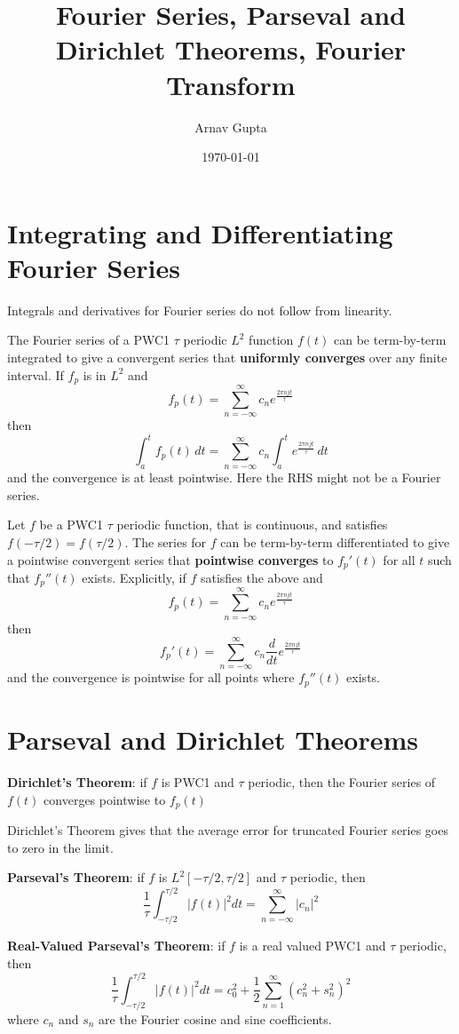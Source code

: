 \documentclass[11pt]{article}
\author{Arnav Gupta}
\date{\today}
\title{Fourier Series, Parseval and Dirichlet Theorems, Fourier Transform}
\begin{document}
\maketitle
\tableofcontents

\section{Integrating and Differentiating Fourier Series}
\label{sec:org465c8c5}
Integrals and derivatives for Fourier series do not follow from linearity.

The Fourier series of a PWC1 \(\tau\) periodic \(L^{2}\) function \(f(t)\) can be term-by-term integrated to give a convergent
series that \textbf{uniformly converges} over any finite interval.
If \(f_{p}\) is in \(L^{2}\) and
$$
f_{p}(t) = \sum_{n = -\infty}^{\infty} c_{n} e^{\frac{2\pi n j t}{\tau}}
$$
then
$$
\int_{a}^{t} f_{p}(t) \, dt = \sum_{n = -\infty}^{\infty} c_{n} \int_{a}^{t} e^{\frac{2\pi n j t}{\tau}} \, dt
$$
and the convergence is at least pointwise.
Here the RHS might not be a Fourier series.

Let \(f\) be a PWC1 \(\tau\) periodic function, that is continuous, and satisfies \(f(-\tau/2) = f(\tau/2)\).
The series for \(f\) can be term-by-term differentiated to give a pointwise convergent series that
\textbf{pointwise converges} to \(f_{p}'(t)\) for all \(t\) such that \(f_{p}''(t)\) exists.
Explicitly, if \(f\) satisfies the above and
$$
f_{p}(t) = \sum_{n = -\infty}^{\infty} c_{n} e^{\frac{2\pi n j t}{\tau}}
$$
then
$$
f_{p}'(t) = \sum_{n = -\infty}^{\infty} c_{n} \frac{d}{dt} e^{\frac{2 \pi n j t}{\tau}}
$$
and the convergence is pointwise for all points where \(f_{p}''(t)\) exists.
\section{Parseval and Dirichlet Theorems}
\label{sec:org44cfda7}
\textbf{Dirichlet's Theorem}: if \(f\) is PWC1 and \(\tau\) periodic, then the Fourier series of \(f(t)\) converges pointwise to
\(f_{p}(t)\)

Dirichlet's Theorem gives that the average error for truncated Fourier series goes to zero in the limit.

\textbf{Parseval's Theorem}: if \(f\) is \(L^{2}[-\tau/2, \tau/2]\) and \(\tau\) periodic, then
$$
\frac{1}{\tau} \int_{-\tau/2}^{\tau/2} |f(t)|^{2} dt = \sum_{n = -\infty}^{\infty} |c_{n}|^{2}
$$

\textbf{Real-Valued Parseval's Theorem}: if \(f\) is a real valued PWC1 and \(\tau\) periodic, then
$$
\frac{1}{\tau} \int_{-\tau/2}^{\tau/2} |f(t)|^{2} dt = c_{0}^{2} +
\frac{1}{2} \sum_{n = 1}^{\infty} \left(c_{n}^{2} + s_{n}^{2}\right)^{2}
$$
where \(c_{n}\) and \(s_{n}\) are the Fourier cosine and sine coefficients.
\end{document}
